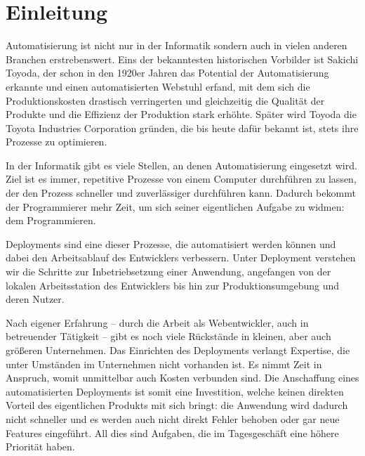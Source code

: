 
\chapter{Einleitung}
\label{ch:einleitung}

Automatisierung ist nicht nur in der Informatik sondern auch in vielen anderen Branchen erstrebenswert. Eins der bekanntesten historischen Vorbilder ist Sakichi Toyoda, der schon in den 1920er Jahren das Potential der Automatisierung erkannte und einen automatisierten Webstuhl erfand, mit dem sich die Produktionskosten drastisch verringerten und gleichzeitig die Qualität der Produkte und die Effizienz der Produktion stark erhöhte. Später wird Toyoda die Toyota Industries Corporation gründen, die bis heute dafür bekannt ist, stets ihre Prozesse zu optimieren.

In der Informatik gibt es viele Stellen, an denen Automatisierung eingesetzt wird. Ziel ist es immer, repetitive Prozesse von einem Computer durchführen zu lassen, der den Prozess schneller und zuverlässiger durchführen kann. Dadurch bekommt der Programmierer mehr Zeit, um sich seiner eigentlichen Aufgabe zu widmen: dem Programmieren.

Deployments sind eine dieser Prozesse, die automatisiert werden können und dabei den Arbeitsablauf des Entwicklers verbessern. Unter Deployment verstehen wir die Schritte zur Inbetriebsetzung einer Anwendung, angefangen von der lokalen Arbeitsstation des Entwicklers bis hin zur Produktionsumgebung und deren Nutzer.

Nach eigener Erfahrung – durch die Arbeit als Webentwickler, auch in betreuender Tätigkeit – gibt es noch viele Rückstände in kleinen, aber auch größeren Unternehmen. Das Einrichten des Deployments verlangt Expertise, die unter Umständen im Unternehmen nicht vorhanden ist. Es nimmt Zeit in Anspruch, womit unmittelbar auch Kosten verbunden sind. Die Anschaffung eines automatisierten Deployments ist somit eine Investition, welche keinen direkten Vorteil des eigentlichen Produkts mit sich bringt: die Anwendung wird dadurch nicht schneller und es werden auch nicht direkt Fehler behoben oder gar neue Features eingeführt. All dies sind Aufgaben, die im Tagesgeschäft eine höhere Priorität haben.

